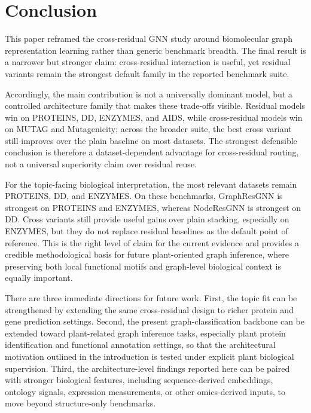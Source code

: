 \section{Conclusion}
\label{sec:conclusion}

This paper reframed the cross-residual GNN study around biomolecular graph representation learning rather than generic benchmark breadth. The final result is a narrower but stronger claim: cross-residual interaction is useful, yet residual variants remain the strongest default family in the reported benchmark suite.

Accordingly, the main contribution is not a universally dominant model, but a controlled architecture family that makes these trade-offs visible. Residual models win on PROTEINS, DD, ENZYMES, and AIDS, while cross-residual models win on MUTAG and Mutagenicity; across the broader suite, the best cross variant still improves over the plain baseline on most datasets. The strongest defensible conclusion is therefore a dataset-dependent advantage for cross-residual routing, not a universal superiority claim over residual reuse.

For the topic-facing biological interpretation, the most relevant datasets remain PROTEINS, DD, and ENZYMES. On these benchmarks, GraphResGNN is strongest on PROTEINS and ENZYMES, whereas NodeResGNN is strongest on DD. Cross variants still provide useful gains over plain stacking, especially on ENZYMES, but they do not replace residual baselines as the default point of reference. This is the right level of claim for the current evidence and provides a credible methodological basis for future plant-oriented graph inference, where preserving both local functional motifs and graph-level biological context is equally important.

There are three immediate directions for future work. First, the topic fit can be strengthened by extending the same cross-residual design to richer protein and gene prediction settings. Second, the present graph-classification backbone can be extended toward plant-related graph inference tasks, especially plant protein identification and functional annotation settings, so that the architectural motivation outlined in the introduction is tested under explicit plant biological supervision. Third, the architecture-level findings reported here can be paired with stronger biological features, including sequence-derived embeddings, ontology signals, expression measurements, or other omics-derived inputs, to move beyond structure-only benchmarks.
